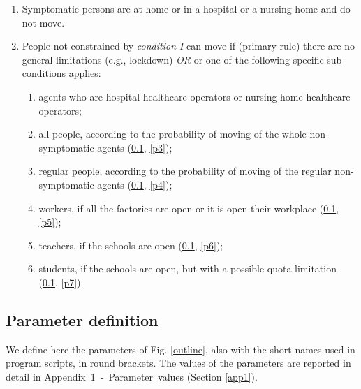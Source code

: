 \documentclass[graybox]{svmult}
\begin{document}
\begin{enumerate}[label=\Roman*]

\item Symptomatic persons are at home or in a hospital or a nursing home and do not move. 

\item People not constrained by \emph{condition I} can move if (primary rule) there are no general limitations (e.g., lockdown) \emph{OR} or one of the following specific sub-conditions applies:

\begin{enumerate}
\item agents who are hospital healthcare operators or nursing home healthcare operators;

\item all people, according to the probability of moving of the whole non-symptomatic agents (\ref{par}, \ref{p3});

\item regular people, according to the probability of moving of the regular non-symptomatic agents
(\ref{par}, \ref{p4});

\item workers, if all the factories are open or it is open their workplace
(\ref{par}, \ref{p5});

\item teachers, if the schools are open
(\ref{par}, \ref{p6});

\item students, if the schools are open, but with a possible quota limitation
(\ref{par}, \ref{p7}).

\end{enumerate}

\end{enumerate}


\subsection{Parameter definition}
\label{par}

We define here the parameters of Fig. \ref{outline}, also with the short names used in program scripts, in round brackets. The values of the parameters are reported in detail in Appendix~1~-~Parameter~values (Section \ref{app1}).
\end{document}
